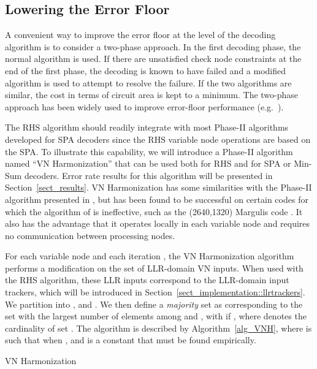 \documentclass[12pt,journal,twoside,draftcls,onecolumn]{IEEEtran}
\begin{document}
\subsection{Lowering the Error Floor}
\label{sect_floor}
A convenient way to improve the error floor at the level of the decoding algorithm is to consider a two-phase approach. In the first decoding phase, the normal algorithm is used. If there are unsatisfied check node constraints at the end of the first phase, the decoding is known to have failed and a modified algorithm is used to attempt to resolve the failure. If the two algorithms are similar, the cost in terms of circuit area is kept to a minimum. The two-phase approach has been widely used to improve error-floor performance (e.g.~\cite{varnica:2006,zhang:2008a,leduc-primeau:2010}).

The RHS algorithm should readily integrate with most Phase-II algorithms developed for SPA decoders since the RHS variable node operations are based on the SPA.
To illustrate this capability, we will introduce a Phase-II algorithm named ``VN Harmonization'' that can be used both for RHS and for SPA or Min-Sum decoders. Error rate results for this algorithm will be presented in Section~\ref{sect_results}.
VN Harmonization has some similarities with the Phase-II algorithm presented in \cite{zhang:2008a}, but has been found to be successful on certain codes for which the algorithm of \cite{zhang:2008a} is ineffective, such as the (2640,1320) Margulis code \cite{rosenthal:2000}. It also has the advantage that it operates locally in each variable node and requires no communication between processing nodes.

For each variable node and each iteration , the VN Harmonization algorithm performs a modification on the set  of LLR-domain VN inputs. When used with the RHS algorithm, these LLR inputs correspond to the LLR-domain input trackers, which will be introduced in Section~\ref{sect_implementation::llrtrackers}.
We partition  into , and .
We then define a \emph{majority} set  as corresponding to the set with the largest number of elements among  and , with  if , where  denotes the cardinality of set .
The algorithm is described by Algorithm~\ref{alg_VNH}, where  is such that  when , and  is a constant that must be found empirically.
\begin{algorithm}
\caption{VN Harmonization}\label{alg_VNH}
\begin{algorithmic}
\If {}
		\If {}
			\State 
		\Else
			\State 
		\EndIf
	\EndFor
\EndIf
\end{algorithmic}
\end{algorithm}
\end{document}
